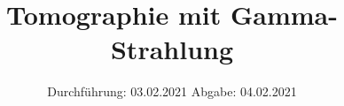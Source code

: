 

\subject{Nr. 14}
\title{Tomographie mit Gamma-Strahlung}
\date{%
  Durchführung: 03.02.2021
  \hspace{3em}
  Abgabe: 04.02.2021
}



\maketitle
\thispagestyle{empty}
\tableofcontents
\newpage






\printbibliography{}


